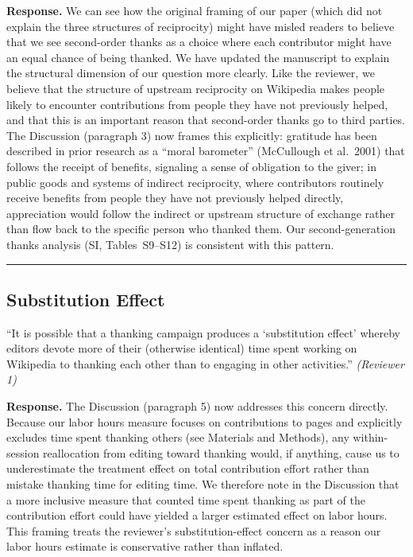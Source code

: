 \documentclass[12pt]{article}
\newenvironment{reviewquote}{%
  \def\FrameCommand{{\color{quotebarcolor}\vrule width 2pt}\colorbox{quotebg}}%
  \MakeFramed{\advance\hsize-\width \FrameRestore}%
  \small
}{%
  \endMakeFramed
}
\begin{document}
\textbf{Response.} We can see how the original framing of our paper (which did not explain the three structures of reciprocity) might have misled readers to believe that we see second-order thanks as a choice where each contributor might have an equal chance of being thanked. We have updated the manuscript to explain the structural dimension of our question more clearly. Like the reviewer, we believe that the structure of upstream reciprocity on Wikipedia makes people likely to encounter contributions from people they have not previously helped, and that this is an important reason that second-order thanks go to third parties. The Discussion (paragraph 3) now frames this explicitly: gratitude has been described in prior research as a ``moral barometer'' (McCullough et al.\ 2001) that follows the receipt of benefits, signaling a sense of obligation to the giver; in public goods and systems of indirect reciprocity, where contributors routinely receive benefits from people they have not previously helped directly, appreciation would follow the indirect or upstream structure of exchange rather than flow back to the specific person who thanked them. Our second-generation thanks analysis (SI, Tables~S9--S12) is consistent with this pattern.

\bigskip\hrule\bigskip

\subsection{Substitution Effect}

\begin{reviewquote}
``It is possible that a thanking campaign produces a `substitution effect' whereby editors devote more of their (otherwise identical) time spent working on Wikipedia to thanking each other than to engaging in other activities.'' \textit{(Reviewer 1)}
\end{reviewquote}

\textbf{Response.} The Discussion (paragraph 5) now addresses this concern directly. Because our labor hours measure focuses on contributions to pages and explicitly excludes time spent thanking others (see Materials and Methods), any within-session reallocation from editing toward thanking would, if anything, cause us to underestimate the treatment effect on total contribution effort rather than mistake thanking time for editing time. We therefore note in the Discussion that a more inclusive measure that counted time spent thanking as part of the contribution effort could have yielded a larger estimated effect on labor hours. This framing treats the reviewer's substitution-effect concern as a reason our labor hours estimate is conservative rather than inflated.
\end{document}
